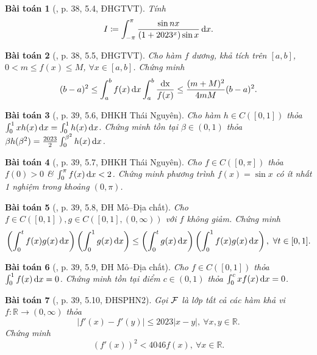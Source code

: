 \documentclass[oneside]{book}
\newtheorem{baitoan}{Bài toán}
\begin{document}
\begin{baitoan}[\cite{VMS_VMC2023}, p. 38, 5.4, ĐHGTVT]
	Tính
	\begin{equation*}
		I\coloneqq\int_{-\pi}^\pi \frac{\sin nx}{(1 + 2023^x)\sin x}\,{\rm d}x.
	\end{equation*}
\end{baitoan}

\begin{baitoan}[\cite{VMS_VMC2023}, p. 38, 5.5, ĐHGTVT]
	Cho hàm $f$ dương, khả tích trên $[a,b]$, $0 < m\le f(x)\le M$, $\forall x\in[a,b]$. Chứng minh
	\begin{equation*}
		(b - a)^2\le\int_a^b f(x)\,{\rm d}x\int_a^b \frac{{\rm dx}}{f(x)}\le\frac{(m + M)^2}{4mM}(b - a)^2.
	\end{equation*}
\end{baitoan}

\begin{baitoan}[\cite{VMS_VMC2023}, p. 39, 5.6, ĐHKH Thái Nguyên]
	Cho hàm $h\in C([0,1])$ thỏa $\int_0^1 xh(x)\,{\rm d}x = \int_0^1 h(x)\,{\rm d}x$. Chứng minh tồn tại $\beta\in(0,1)$ thỏa $\beta h(\beta^2) = \frac{2023}{2}\int_0^{\beta^2} h(x)\,{\rm d}x$.
\end{baitoan}

\begin{baitoan}[\cite{VMS_VMC2023}, p. 39, 5.7, ĐHKH Thái Nguyên]
	Cho $f\in C([0,\pi])$ thỏa $f(0) > 0$ \& $\int_0^\pi f(x)\,{\rm d}x < 2$. Chứng minh phương trình $f(x) = \sin x$ có ít nhất 1 nghiệm trong khoảng $(0,\pi)$.
\end{baitoan}

\begin{baitoan}[\cite{VMS_VMC2023}, p. 39, 5.8, ĐH Mỏ--Địa chất]
	Cho $f\in C([0,1]),g\in C([0,1],(0,\infty))$ với $f$ không giảm. Chứng minh
	\begin{equation*}
		\left(\int_0^t f(x)g(x)\,{\rm d}x\right)\left(\int_0^1 g(x)\,{\rm d}x\right)\le\left(\int_0^t g(x)\,{\rm d}x\right)\left(\int_0^1 f(x)g(x)\,{\rm d}x\right),\ \forall t\in[0,1].
	\end{equation*}
\end{baitoan}

\begin{baitoan}[\cite{VMS_VMC2023}, p. 39, 5.9, ĐH Mỏ--Địa chất]
	Cho $f\in C([0,1])$ thỏa $\int_0^1 f(x)\,{\rm d}x = 0$. Chứng minh tồn tại điểm $c\in(0,1)$ thỏa $\int_0^c xf(x)\,{\rm d}x = 0$.
\end{baitoan}

\begin{baitoan}[\cite{VMS_VMC2023}, p. 39, 5.10, ĐHSPHN2]
	Gọi ${\cal F}$ là lớp tất cả các hàm khả vi $f:\mathbb{R}\to(0,\infty)$ thỏa
	\begin{equation*}
		|f'(x) - f'(y)|\le2023|x - y|,\ \forall x,y\in\mathbb{R}.
	\end{equation*}
	Chứng minh
	\begin{equation*}
		(f'(x))^2 < 4046f(x),\ \forall x\in\mathbb{R}.
	\end{equation*}
\end{baitoan}
\end{document}
